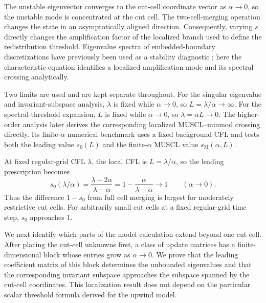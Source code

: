 \documentclass[preprint,12pt]{elsarticle}
\begin{document}
The unstable eigenvector converges to the cut-cell coordinate vector as
$\alpha\to0$, so the unstable mode is concentrated at the cut cell.
The two-cell-merging operation changes the state in an asymptotically aligned direction.
Consequently, varying $s$ directly changes the amplification factor of the
localized branch used to define the redistribution threshold.
Eigenvalue spectra of embedded-boundary discretizations have previously been
used as a stability diagnostic \cite{DevendranGravesJohansenLigocki2017}; here
the characteristic equation identifies a localized amplification mode and its
spectral crossing analytically.

Two limits are used and are kept separate throughout.  For the singular
eigenvalue and invariant-subspace analysis, $\lambda$ is fixed while
$\alpha\to0$, so $L=\lambda/\alpha\to\infty$.  For the spectral-threshold
expansion, $L$ is fixed while $\alpha\to0$, so $\lambda=\alpha L\to0$.
The higher-order analysis later derives the corresponding localized
MUSCL--minmod crossing directly.  Its finite-$\alpha$ numerical benchmark
uses a fixed background CFL and tests both the leading value $s_0(L)$ and the
finite-$\alpha$ MUSCL value $s_{\mathrm M}(\alpha,L)$.

At fixed regular-grid CFL $\lambda$, the local CFL is $L=\lambda/\alpha$, so the leading
prescription becomes
\[
    s_0(\lambda/\alpha)
    =\frac{\lambda-2\alpha}{\lambda-\alpha}
    =1-\frac{\alpha}{\lambda-\alpha}
    \longrightarrow 1
    \qquad (\alpha\to0).
\]
Thus the difference $1-s_0$ from full cell merging is largest for moderately
restrictive cut cells.  For arbitrarily small cut cells at a fixed regular-grid
time step, $s_0$ approaches $1$.

We next identify which parts of the model calculation extend beyond one cut
cell.  After placing the cut-cell unknowns first, a class of update matrices has
a finite-dimensional block whose entries grow as $\alpha\to0$.  We prove that
the leading coefficient matrix of this block determines the unbounded
eigenvalues and that the corresponding invariant subspace approaches the
subspace spanned by the cut-cell coordinates.  This localization result does
not depend on the particular scalar threshold formula derived for the upwind
model.
\end{document}
